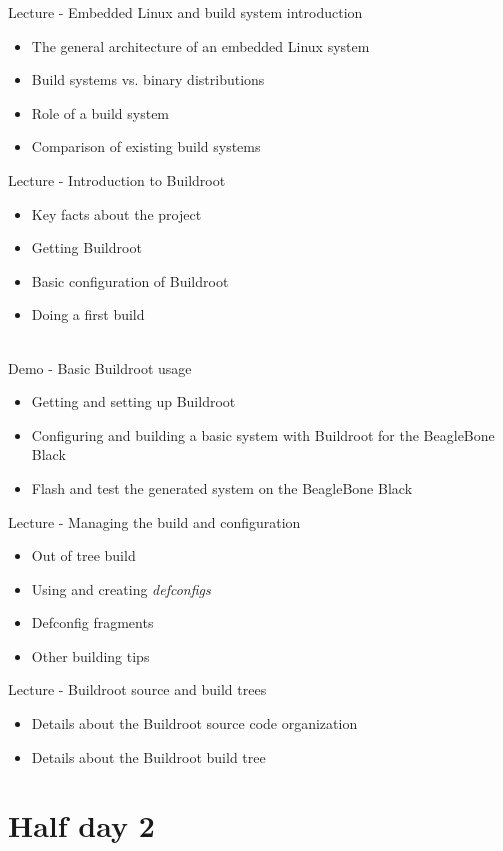 \documentclass[a4paper,12pt,obeyspaces,spaces,hyphens]{article}
\begin{document}
\feagendatwocolumn
{Lecture - Embedded Linux and build system introduction}
{
  \begin{itemize}
  \item The general architecture of an embedded Linux system
  \item Build systems vs. binary distributions
  \item Role of a build system
  \item Comparison of existing build systems
  \end{itemize}
}
{Lecture - Introduction to Buildroot}
{
  \begin{itemize}
  \item Key facts about the project
  \item Getting Buildroot
  \item Basic configuration of Buildroot
  \item Doing a first build
  \end{itemize}
}
\\
\feagendatwocolumn
{Demo - Basic Buildroot usage}
{
  \begin{itemize}
  \item Getting and setting up Buildroot
  \item Configuring and building a basic system with Buildroot for the
    BeagleBone Black
  \item Flash and test the generated system on the BeagleBone Black
  \end{itemize}
}
{Lecture - Managing the build and configuration}
{
  \begin{itemize}
  \item Out of tree build
  \item Using and creating {\em defconfigs}
  \item Defconfig fragments
  \item Other building tips
  \end{itemize}
}

\feagendaonecolumn
{Lecture - Buildroot source and build trees}
{
  \begin{itemize}
  \item Details about the Buildroot source code organization
  \item Details about the Buildroot build tree
  \end{itemize}
}


\section{Half day 2}
\end{document}
